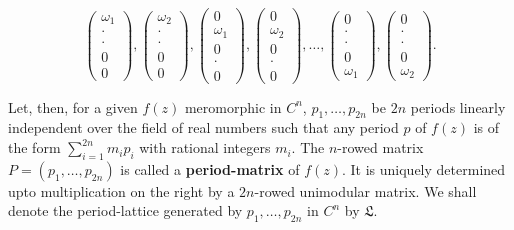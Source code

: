 $$
\begin{pmatrix}
\omega_{1}\\
\cdot\\
\cdot\\
0\\
0
\end{pmatrix},
\begin{pmatrix}
\omega_{2}\\
\cdot\\
\cdot\\
0\\
0
\end{pmatrix},
\begin{pmatrix}
0\\
\omega_{1}\\
0\\
\cdot\\
0
\end{pmatrix},
\begin{pmatrix}
0\\
\omega_{2}\\
0\\
\cdot\\
0
\end{pmatrix},\ldots,
\begin{pmatrix}
0\\
\cdot\\
\cdot\\
0\\
\omega_{1}
\end{pmatrix},
\begin{pmatrix}
0\\
\cdot\\
\cdot\\
0\\
\omega_{2}
\end{pmatrix}.
$$

Let, then, for a given $f(z)$ meromorphic in $C^{n}$,
$p_{1},\ldots,p_{2n}$ be $2n$ periods linearly independent over the
field of real numbers such that any period $p$ of $f(z)$ is of the
form $\sum^{2n}_{i=1}m_{i}p_{i}$ with rational integers $m_{i}$. The
$n$-rowed matrix $P=(p_{1},\ldots,p_{2n})$ is called a {\bf
  period-matrix} of $f(z)$. It is uniquely determined upto
multiplication on the right by a $2n$-rowed unimodular matrix. We
shall denote the period-lattice generated by $p_{1},\ldots,p_{2n}$ in
$C^{n}$ by $\mathfrak{L}$.


